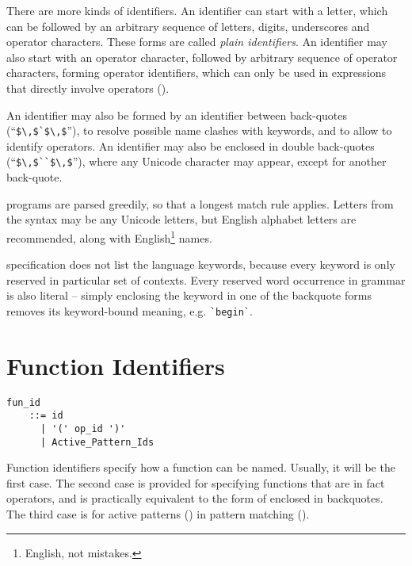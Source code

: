 There are more kinds of identifiers. An identifier can start with a letter, which can be followed by an arbitrary sequence of letters, digits, underscores and operator characters. These forms are called {\em plain identifiers}. An identifier may also start with an operator character, followed by arbitrary sequence of operator characters, forming operator identifiers, which can only be used in expressions that directly involve operators (). 

An identifier may also be formed by an identifier between back-quotes (``\lstinline!$\,$`$\,$!''), to resolve possible name clashes with \Aml keywords, and to allow to identify operators. An identifier may also be enclosed in double back-quotes (``\lstinline!$\,$``$\,$!''), where any Unicode character may appear, except for another back-quote. 

\Aml programs are parsed greedily, so that a longest match rule applies. Letters from the syntax may be any Unicode letters, but English alphabet letters are recommended, along with English\footnote{English, not mistakes.} names.

\Aml specification does not list the language keywords, because every keyword is only reserved in particular set of contexts. Every reserved word occurrence in grammar is also literal -- simply enclosing the keyword in one of the backquote forms removes its keyword-bound meaning, e.g. \lstinline[deletekeywords={begin}]!`begin`!. 





\section{Function Identifiers}
\label{sec:function-identifiers}

\syntax\begin{lstlisting}
fun_id 
    ::= id
      | '(' op_id ')'
      | Active_Pattern_Ids
\end{lstlisting}

Function identifiers specify how a function can be named. Usually, it will be the first case. The second case is provided for specifying functions that are in fact operators, and is practically equivalent to the form of  enclosed in backquotes. The third case is for active patterns () in pattern matching (). 





